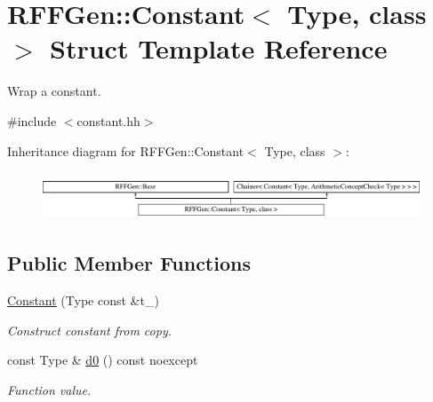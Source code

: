 \hypertarget{structRFFGen_1_1Constant}{\section{R\-F\-F\-Gen\-:\-:Constant$<$ Type, class $>$ Struct Template Reference}
\label{structRFFGen_1_1Constant}
}


Wrap a constant.  




{\ttfamily \#include $<$constant.\-hh$>$}

Inheritance diagram for R\-F\-F\-Gen\-:\-:Constant$<$ Type, class $>$\-:\begin{figure}[H]
\begin{center}
\leavevmode
\includegraphics[height=1.435897cm]{structRFFGen_1_1Constant}
\end{center}
\end{figure}
\subsection*{Public Member Functions}
\begin{DoxyCompactItemize}
\item 
\hypertarget{structRFFGen_1_1Constant_ae2d0e64d773d967430d13e47817d6d84}{\hyperlink{structRFFGen_1_1Constant_ae2d0e64d773d967430d13e47817d6d84}{Constant} (Type const \&t\-\_\-)}\label{structRFFGen_1_1Constant_ae2d0e64d773d967430d13e47817d6d84}

\begin{DoxyCompactList}\small\item\em Construct constant from copy. \end{DoxyCompactList}\item 
\hypertarget{structRFFGen_1_1Constant_a185f8aa750fe120dbe255de11107b7e1}{const Type \& \hyperlink{structRFFGen_1_1Constant_a185f8aa750fe120dbe255de11107b7e1}{d0} () const noexcept}\label{structRFFGen_1_1Constant_a185f8aa750fe120dbe255de11107b7e1}

\begin{DoxyCompactList}\small\item\em Function value. \end{DoxyCompactList}\end{DoxyCompactItemize}


